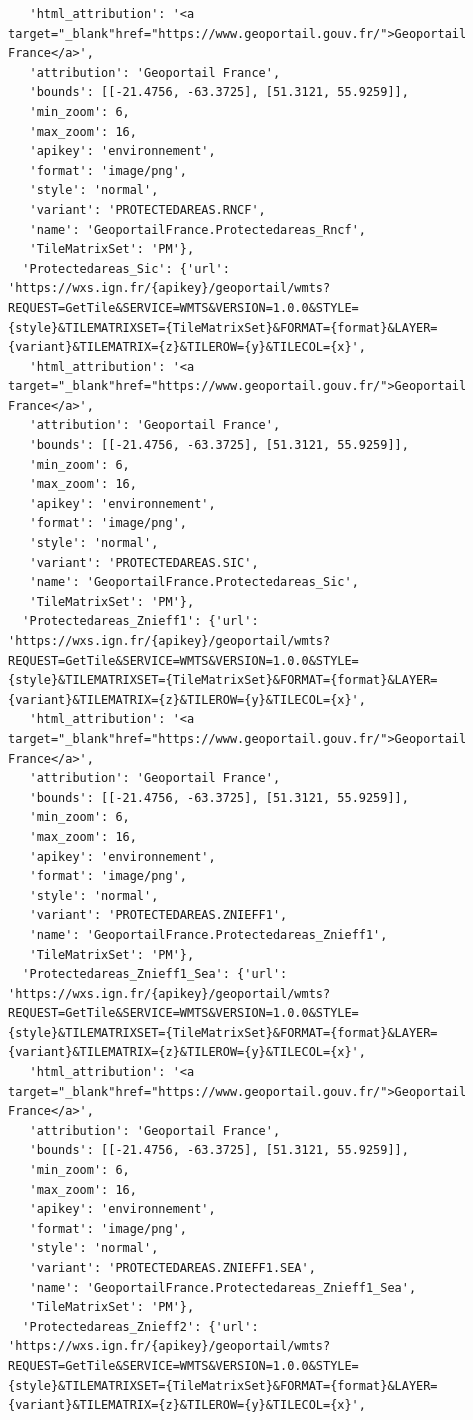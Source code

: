 \documentclass[
  letterpaper,
  DIV=11,
  numbers=noendperiod]{scrreprt}
\begin{document}
\begin{verbatim}
   'html_attribution': '<a target="_blank"href="https://www.geoportail.gouv.fr/">Geoportail France</a>',
   'attribution': 'Geoportail France',
   'bounds': [[-21.4756, -63.3725], [51.3121, 55.9259]],
   'min_zoom': 6,
   'max_zoom': 16,
   'apikey': 'environnement',
   'format': 'image/png',
   'style': 'normal',
   'variant': 'PROTECTEDAREAS.RNCF',
   'name': 'GeoportailFrance.Protectedareas_Rncf',
   'TileMatrixSet': 'PM'},
  'Protectedareas_Sic': {'url': 'https://wxs.ign.fr/{apikey}/geoportail/wmts?REQUEST=GetTile&SERVICE=WMTS&VERSION=1.0.0&STYLE={style}&TILEMATRIXSET={TileMatrixSet}&FORMAT={format}&LAYER={variant}&TILEMATRIX={z}&TILEROW={y}&TILECOL={x}',
   'html_attribution': '<a target="_blank"href="https://www.geoportail.gouv.fr/">Geoportail France</a>',
   'attribution': 'Geoportail France',
   'bounds': [[-21.4756, -63.3725], [51.3121, 55.9259]],
   'min_zoom': 6,
   'max_zoom': 16,
   'apikey': 'environnement',
   'format': 'image/png',
   'style': 'normal',
   'variant': 'PROTECTEDAREAS.SIC',
   'name': 'GeoportailFrance.Protectedareas_Sic',
   'TileMatrixSet': 'PM'},
  'Protectedareas_Znieff1': {'url': 'https://wxs.ign.fr/{apikey}/geoportail/wmts?REQUEST=GetTile&SERVICE=WMTS&VERSION=1.0.0&STYLE={style}&TILEMATRIXSET={TileMatrixSet}&FORMAT={format}&LAYER={variant}&TILEMATRIX={z}&TILEROW={y}&TILECOL={x}',
   'html_attribution': '<a target="_blank"href="https://www.geoportail.gouv.fr/">Geoportail France</a>',
   'attribution': 'Geoportail France',
   'bounds': [[-21.4756, -63.3725], [51.3121, 55.9259]],
   'min_zoom': 6,
   'max_zoom': 16,
   'apikey': 'environnement',
   'format': 'image/png',
   'style': 'normal',
   'variant': 'PROTECTEDAREAS.ZNIEFF1',
   'name': 'GeoportailFrance.Protectedareas_Znieff1',
   'TileMatrixSet': 'PM'},
  'Protectedareas_Znieff1_Sea': {'url': 'https://wxs.ign.fr/{apikey}/geoportail/wmts?REQUEST=GetTile&SERVICE=WMTS&VERSION=1.0.0&STYLE={style}&TILEMATRIXSET={TileMatrixSet}&FORMAT={format}&LAYER={variant}&TILEMATRIX={z}&TILEROW={y}&TILECOL={x}',
   'html_attribution': '<a target="_blank"href="https://www.geoportail.gouv.fr/">Geoportail France</a>',
   'attribution': 'Geoportail France',
   'bounds': [[-21.4756, -63.3725], [51.3121, 55.9259]],
   'min_zoom': 6,
   'max_zoom': 16,
   'apikey': 'environnement',
   'format': 'image/png',
   'style': 'normal',
   'variant': 'PROTECTEDAREAS.ZNIEFF1.SEA',
   'name': 'GeoportailFrance.Protectedareas_Znieff1_Sea',
   'TileMatrixSet': 'PM'},
  'Protectedareas_Znieff2': {'url': 'https://wxs.ign.fr/{apikey}/geoportail/wmts?REQUEST=GetTile&SERVICE=WMTS&VERSION=1.0.0&STYLE={style}&TILEMATRIXSET={TileMatrixSet}&FORMAT={format}&LAYER={variant}&TILEMATRIX={z}&TILEROW={y}&TILECOL={x}',

\end{verbatim}
\end{document}
